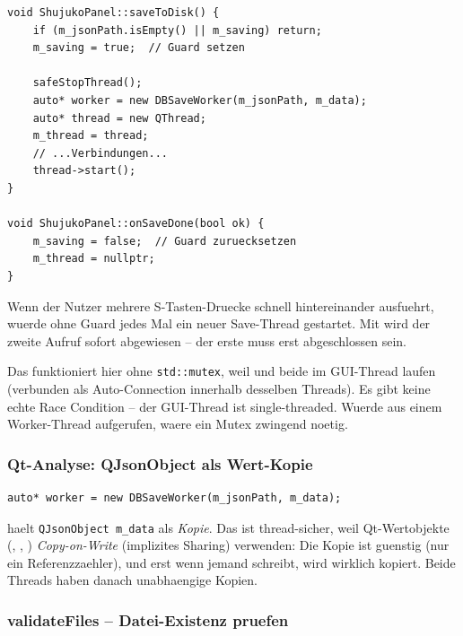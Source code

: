 \begin{lstlisting}[caption={saveToDisk: m\_saving als einfacher Guard}]
void ShujukoPanel::saveToDisk() {
    if (m_jsonPath.isEmpty() || m_saving) return;
    m_saving = true;  // Guard setzen

    safeStopThread();
    auto* worker = new DBSaveWorker(m_jsonPath, m_data);
    auto* thread = new QThread;
    m_thread = thread;
    // ...Verbindungen...
    thread->start();
}

void ShujukoPanel::onSaveDone(bool ok) {
    m_saving = false;  // Guard zuruecksetzen
    m_thread = nullptr;
}
\end{lstlisting}

Wenn der Nutzer mehrere S-Tasten-Druecke schnell hintereinander
ausfuehrt, wuerde ohne Guard jedes Mal ein neuer Save-Thread
gestartet. Mit  wird der zweite Aufruf
sofort abgewiesen -- der erste muss erst abgeschlossen sein.

\begin{warnung}[title={Achtung: Kein Mutex noetig?}]
Das funktioniert hier ohne \verb|std::mutex|, weil
 und  beide
im GUI-Thread laufen (verbunden als Auto-Connection
innerhalb desselben Threads). Es gibt keine echte
Race Condition -- der GUI-Thread ist single-threaded.
Wuerde  aus einem Worker-Thread
aufgerufen, waere ein Mutex zwingend noetig.
\end{warnung}

\subsubsection{Qt-Analyse: QJsonObject als Wert-Kopie}

\begin{lstlisting}
auto* worker = new DBSaveWorker(m_jsonPath, m_data);
\end{lstlisting}

 haelt \verb|QJsonObject m_data|
als \emph{Kopie}. Das ist thread-sicher, weil Qt-Wertobjekte
(, , )
\emph{Copy-on-Write} (implizites Sharing) verwenden:
Die Kopie ist guenstig (nur ein Referenzzaehler), und erst
wenn jemand schreibt, wird wirklich kopiert. Beide
Threads haben danach unabhaengige Kopien.

\subsubsection{validateFiles -- Datei-Existenz pruefen}

